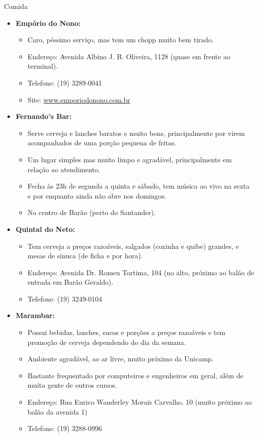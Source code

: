 \begin{story}{Comida}
\begin{itemize}
\item \textbf{Empório do Nono:}
\begin{itemize}
\item Caro, péssimo serviço, mas tem um chopp muito bem tirado.
\item Endereço: Avenida Albino J. B. Oliveira, 1128 (quase em frente ao terminal).
\item Telefone: (19) 3289-0041
\item Site: \url{www.emporiodonono.com.br}
\end{itemize}

\item \textbf{Fernando's Bar:}
\begin{itemize}
\item Serve cerveja e lanches baratos e muito bons, principalmente por virem acompanhados de uma porção pequena de fritas.
\item Um lugar simples mas muito limpo e agradável, principalmente em relação ao atendimento.
\item Fecha às 23h de segunda a quinta e sábado, tem música ao vivo na sexta e por enquanto ainda não abre nos domingos.
\item No centro de Barão (perto do Santander).
\end{itemize}

\item \textbf{Quintal do Neto:}
\begin{itemize}
\item Tem cerveja a preços razoáveis, salgados (coxinha e quibe) grandes, e mesas de sinuca (de ficha e por hora).
\item Endereço: Avenida Dr. Romeu Tortima, 104 (no alto, próximo ao balão de entrada em Barão Geraldo).
\item Tefefone: (19) 3249-0104
\end{itemize}

\item \textbf{Marambar:}
\begin{itemize}
\item Possui bebidas, lanches, sucos e porções a preços razoáveis e tem promoção de cerveja dependendo do dia da semana.
\item Ambiente agradável, ao ar livre, muito próximo da Unicamp.
\item Bastante frequentado por computeiros e engenheiros em geral, além de muita gente de outros cursos.
\item Endereço: Rua Eurico Wanderley Morais Carvalho, 10 (muito próximo ao balão da avenida 1)
\item Telefone: (19) 3288-0996
\end{itemize}


\end{itemize}
\end{story}
